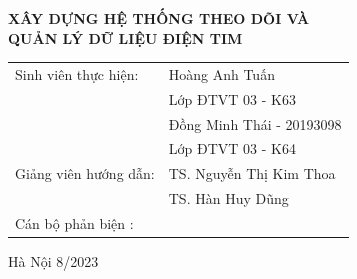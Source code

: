   \begin{center}
     \textbf{\fontsize{20pt}{0pt}\selectfont XÂY DỰNG HỆ THỐNG THEO DÕI VÀ } \\
     \textbf{\fontsize{20pt}{0pt}\selectfont QUẢN LÝ DỮ LIỆU ĐIỆN TIM }
  
  \vspace{1.5cm}
  \begin{table}[H]
       \centering
       \begin{tabular}{l l}
            \fontsize{14pt}{0pt}\selectfont Sinh viên thực hiện:      & \fontsize{14pt}{0pt}\selectfont Hoàng Anh Tuấn \\
            &\fontsize{14pt}{0pt}\selectfont Lớp ĐTVT 03 - K63 \vspace{6pt} \\
            &\fontsize{14pt}{0pt}\selectfont Đồng Minh Thái - 20193098  \\
            &\fontsize{14pt}{0pt}\selectfont Lớp ĐTVT 03 - K64 \vspace{6pt} \\
            \fontsize{14pt}{0pt}\selectfont Giảng viên hướng dẫn: & \fontsize{14pt}{0pt}\selectfont TS. Nguyễn Thị Kim Thoa  \vspace{6pt} \\  
              &\fontsize{14pt}{0pt}\selectfont TS. Hàn Huy Dũng \vspace{6pt} \\
            Cán bộ phản biện : &
       \end{tabular}
  \end{table}
  \vspace{0.4cm} %
  \fontsize{14pt}{0pt}\selectfont Hà Nội 8/2023
  \end{center}
  
  \cleardoublepage %
  
